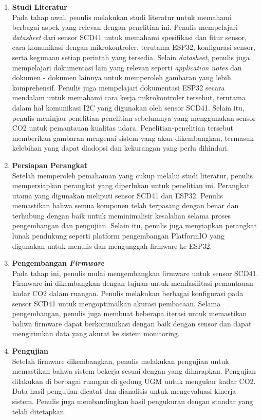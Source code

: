 \begin{enumerate}
    \item \textbf{Studi Literatur} \\
         Pada tahap awal, penulis melakukan studi literatur untuk memahami berbagai aspek yang relevan dengan penelitian ini. Penulis mempelajari \textit{datasheet} dari sensor SCD41 untuk memahami spesifikasi dan fitur sensor, cara komunikasi dengan mikrokontroler, terutama ESP32, konfigurasi sensor, serta kegunaan setiap perintah yang tersedia. Selain \textit{datasheet}, penulis juga mempelajari dokumentasi lain yang relevan seperti \textit{application notes} dan dokumen - dokumen lainnya untuk memperoleh gambaran yang lebih komprehensif. Penulis juga mempelajari dokumentasi ESP32 secara mendalam untuk memahami cara kerja mikrokontroler tersebut, terutama dalam hal komunikasi I2C yang digunakan oleh sensor SCD41. Selain itu, penulis meninjau penelitian-penelitian sebelumnya yang menggunakan sensor CO2 untuk pemantauan kualitas udara. Penelitian-penelitian tersebut memberikan gambaran mengenai sistem yang akan dikembangkan, termasuk kelebihan yang dapat diadopsi dan kekurangan yang perlu dihindari.
        
    \item \textbf{Persiapan Perangkat} \\
        Setelah memperoleh pemahaman yang cukup melalui studi literatur, penulis mempersiapkan perangkat yang diperlukan untuk penelitian ini. Perangkat utama yang digunakan meliputi sensor SCD41 dan ESP32. Penulis memastikan bahwa semua komponen telah terpasang dengan benar dan terhubung dengan baik untuk meminimalisir kesalahan selama proses pengembangan dan pengujian. Selain itu, penulis juga menyiapkan perangkat lunak pendukung seperti platform pengembangan PlatformIO yang digunakan untuk menulis dan mengunggah firmware ke ESP32.

    \item \textbf{Pengembangan \textit{Firmware}} \\
        Pada tahap ini, penulis mulai mengembangkan firmware untuk sensor SCD41. Firmware ini dikembangkan dengan tujuan untuk memfasilitasi pemantauan kadar CO2 dalam ruangan. Penulis melakukan berbagai konfigurasi pada sensor SCD41 untuk mengoptimalkan akurasi pembacaan. Selama pengembangan, penulis juga membuat beberapa iterasi untuk memastikan bahwa firmware dapat berkomunikasi dengan baik dengan sensor dan dapat mengirimkan data yang akurat ke sistem monitoring.

    \item \textbf{Pengujian} \\
        Setelah firmware dikembangkan, penulis melakukan pengujian untuk memastikan bahwa sistem bekerja sesuai dengan yang diharapkan. Pengujian dilakukan di berbagai ruangan di gedung UGM untuk mengukur kadar CO2. Data hasil pengujian dicatat dan dianalisis untuk mengevaluasi kinerja sistem. Penulis juga membandingkan hasil pengukuran dengan standar yang telah ditetapkan.


\end{enumerate}
